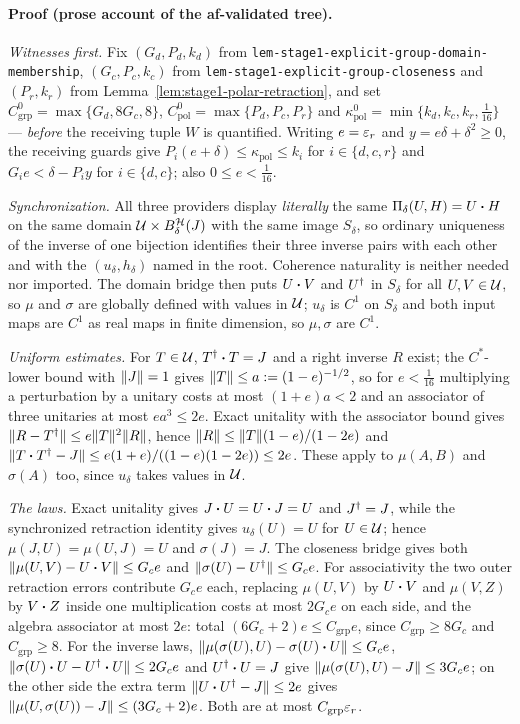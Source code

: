\paragraph{Proof (prose account of the af-validated tree).}
\emph{Witnesses first.} Fix $(G_d,P_d,k_d)$ from
\texttt{lem-stage1-explicit-group-domain-membership}, $(G_c,P_c,k_c)$ from
\texttt{lem-stage1-explicit-group-closeness} and $(P_r,k_r)$ from
Lemma~\ref{lem:stage1-polar-retraction}, and set
$C^{0}_{\mathrm{grp}}=\max\{G_d,8G_c,8\}$, $C^{0}_{\mathrm{pol}}=\max\{P_d,P_c,P_r\}$ and
$\kappa^{0}_{\mathrm{pol}}=\min\{k_d,k_c,k_r,\tfrac1{16}\}$ --- \emph{before} the receiving
tuple $W$ is quantified. Writing $e=\varepsilon_r$ and $y=e\delta+\delta^{2}\ge0$, the receiving
guards give $P_i(e+\delta)\le\kappa_{\mathrm{pol}}\le k_i$ for $i\in\{d,c,r\}$ and
$G_ie<\delta-P_iy$ for $i\in\{d,c\}$; also $0\le e<\tfrac1{16}$.

\emph{Synchronization.} All three providers display \emph{literally} the same
$\Pi_\delta(U,H)=U\mathbin{\bm{\cdot}} H$ on the same domain $\mathcal U\times B^{\mathcal H}_{\delta}(J)$ with the
same image $S_\delta$, so ordinary uniqueness of the inverse of one bijection identifies
their three inverse pairs with each other and with the $(u_\delta,h_\delta)$ named in the
root. Coherence naturality is neither needed nor imported. The domain bridge then puts
$U\mathbin{\bm{\cdot}} V$ and $U^{\dagger}$ in $S_\delta$ for all $U,V\in\mathcal U$, so $\mu$ and $\sigma$ are
globally defined with values in $\mathcal U$; $u_\delta$ is $C^{1}$ on $S_\delta$ and both input
maps are $C^{1}$ as real maps in finite dimension, so $\mu,\sigma$ are $C^{1}$.

\emph{Uniform estimates.} For $T\in\mathcal U$, $T^{\dagger}\mathbin{\bm{\cdot}} T=J$ and a right inverse $R$ exist; the
$C^*$-lower bound with $\lVert J\rVert=1$ gives $\lVert T\rVert\le a:=(1-e)^{-1/2}$, so for $e<\tfrac1{16}$
multiplying a perturbation by a unitary costs at most $(1+e)a<2$ and an associator of three
unitaries at most $ea^{3}\le2e$. Exact unitality with the associator bound gives
$\lVert R-T^{\dagger}\rVert\le e\lVert T\rVert^{2}\lVert R\rVert$, hence $\lVert R\rVert\le\lVert T\rVert(1-e)/(1-2e)$ and
$\lVert T\mathbin{\bm{\cdot}} T^{\dagger}-J\rVert\le e(1+e)/((1-e)(1-2e))\le2e$. These apply to $\mu(A,B)$ and
$\sigma(A)$ too, since $u_\delta$ takes values in $\mathcal U$.

\emph{The laws.} Exact unitality gives $J\mathbin{\bm{\cdot}} U=U\mathbin{\bm{\cdot}} J=U$ and $J^{\dagger}=J$, while the
synchronized retraction identity gives $u_\delta(U)=U$ for $U\in\mathcal U$; hence
$\mu(J,U)=\mu(U,J)=U$ and $\sigma(J)=J$. The closeness bridge gives both
$\lVert \mu(U,V)-U\mathbin{\bm{\cdot}} V\rVert\le G_ce$ and $\lVert \sigma(U)-U^{\dagger}\rVert\le G_ce$. For associativity the
two outer retraction errors contribute $G_ce$ each, replacing $\mu(U,V)$ by $U\mathbin{\bm{\cdot}} V$ and
$\mu(V,Z)$ by $V\mathbin{\bm{\cdot}} Z$ inside one multiplication costs at most $2G_ce$ on each side, and
the algebra associator at most $2e$: total $(6G_c+2)e\le C_{\mathrm{grp}}e$, since
$C_{\mathrm{grp}}\ge8G_c$ and $C_{\mathrm{grp}}\ge8$. For the inverse laws,
$\lVert \mu(\sigma(U),U)-\sigma(U)\mathbin{\bm{\cdot}} U\rVert\le G_ce$, $\lVert \sigma(U)\mathbin{\bm{\cdot}} U-U^{\dagger}\mathbin{\bm{\cdot}} U\rVert\le2G_ce$
and $U^{\dagger}\mathbin{\bm{\cdot}} U=J$ give $\lVert \mu(\sigma(U),U)-J\rVert\le3G_ce$; on the other side the extra
term $\lVert U\mathbin{\bm{\cdot}} U^{\dagger}-J\rVert\le2e$ gives $\lVert \mu(U,\sigma(U))-J\rVert\le(3G_c+2)e$. Both are at
most $C_{\mathrm{grp}}\varepsilon_r$.

